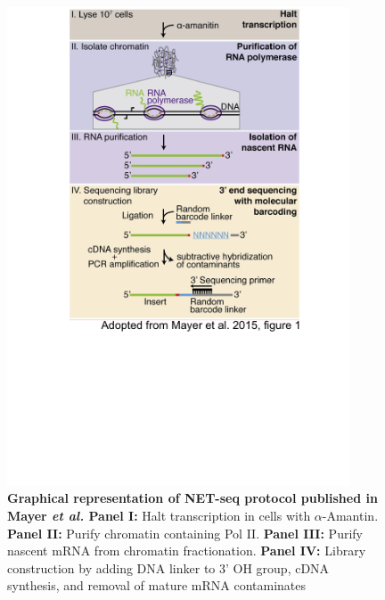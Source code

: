 \begin{figure}
\centering \includegraphics[trim=0 .5in 0
  0,clip,width=4in]{img/ch04/Figure1.pdf}
\caption[Graphical representation of NET-seq protocol]{\textbf{ Graphical representation of NET-seq protocol published in Mayer \emph{et al.} \citep{mayer_native_2015}}  {\bf Panel I:} Halt transcription in cells with $\alpha$-Amantin. {\bf Panel II:} Purify chromatin containing Pol II. {\bf Panel III:}  Purify nascent mRNA from chromatin fractionation. {\bf Panel IV:}  Library construction by adding DNA linker to 3' OH group, cDNA synthesis, and removal of mature mRNA contaminates}
\label{fig:ch04-protocol}
\end{figure}


